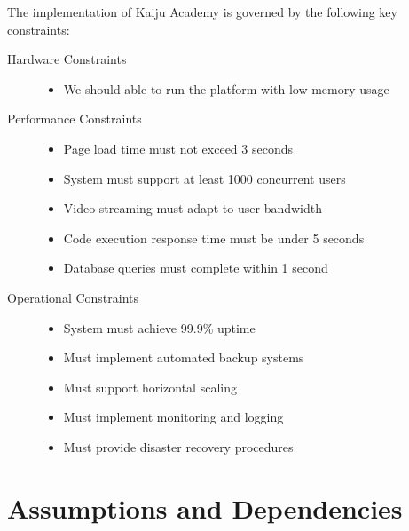 \documentclass[a4paper, 11pt]{scrreprt}
\begin{document}
The implementation of Kaiju Academy is governed by the following key constraints:

\begin{description}
    \item[Hardware Constraints]\mbox{}
        \begin{itemize}
            \item We should able to run the platform with low memory usage
        \end{itemize}
    
    \item[Performance Constraints]\mbox{}
        \begin{itemize}
            \item Page load time must not exceed 3 seconds
            \item System must support at least 1000 concurrent users
            \item Video streaming must adapt to user bandwidth
            \item Code execution response time must be under 5 seconds
            \item Database queries must complete within 1 second
        \end{itemize}
    
    \item[Operational Constraints]\mbox{}
        \begin{itemize}
            \item System must achieve 99.9\% uptime
            \item Must implement automated backup systems
            \item Must support horizontal scaling
            \item Must implement monitoring and logging
            \item Must provide disaster recovery procedures
        \end{itemize}
\end{description}

\section{Assumptions and Dependencies}
\end{document}

